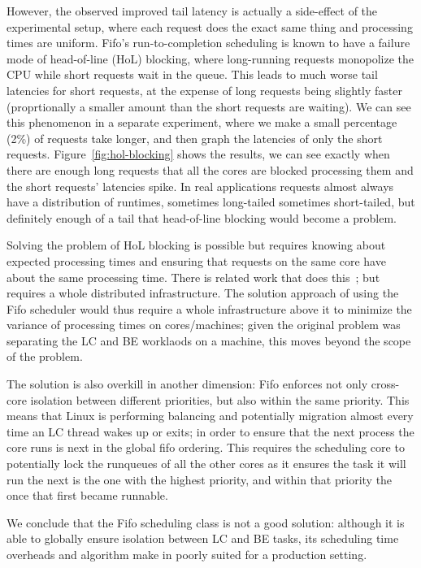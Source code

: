 However, the observed improved tail latency is actually a side-effect of the
experimental setup, where each request does the exact same thing and processing
times are uniform. Fifo's run-to-completion scheduling is known to have a
failure mode of head-of-line (HoL) blocking, where long-running requests
monopolize the CPU while short requests wait in the queue. This leads to much
worse tail latencies for short requests, at the expense of long requests being
slightly faster (proprtionally a smaller amount than the short requests are
waiting). We can see this phenomenon in a separate experiment, where we make a
small percentage (2\%) of requests take longer, and then graph the latencies of
only the short requests. Figure~\ref{fig:hol-blocking} shows the results, we can
see exactly when there are enough long requests that all the cores are blocked
processing them and the short requests' latencies spike. In real applications
requests almost always have a distribution of runtimes, sometimes long-tailed
sometimes short-tailed, but definitely enough of a tail that head-of-line
blocking would become a problem.

Solving the problem of HoL blocking is possible but requires knowing about
expected processing times and ensuring that requests on the same core have about
the same processing time. There is related work that does this~\cite{TODO}; but
requires a whole distributed infrastructure. The solution approach of using the
Fifo scheduler would thus require a whole infrastructure above it to minimize
the variance of processing times on cores/machines; given the original problem
was separating the LC and BE worklaods on a machine, this moves beyond the scope
of the problem.

The solution is also overkill in another dimension: Fifo enforces not only
cross-core isolation between different priorities, but also within the same
priority. This means that Linux is performing balancing and potentially
migration almost every time an LC thread wakes up or exits; in order to ensure
that the next process the core runs is next in the global fifo ordering. This
requires the scheduling core to potentially lock the runqueues of all the other
cores as it ensures the task it will run the next is the one with the highest
priority, and within that priority the once that first became runnable.

We conclude that the Fifo scheduling class is not a good solution: although it
is able to globally ensure isolation between LC and BE tasks, its scheduling
time overheads and algorithm make in poorly suited for a production setting.




